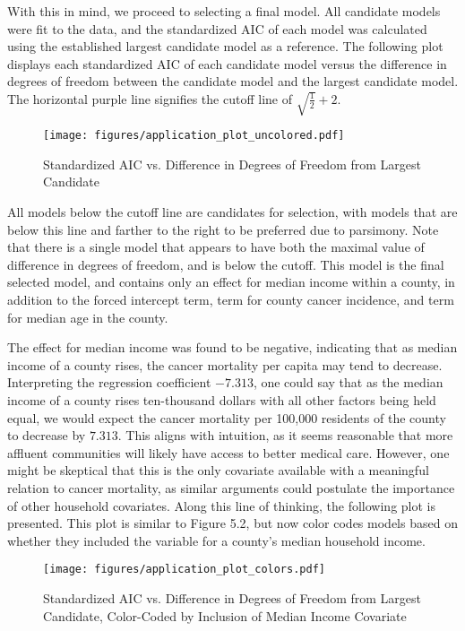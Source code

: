 		With this in mind, we proceed to selecting a final model. All candidate models were fit to the data, and the standardized AIC of each model was calculated
		using the established largest candidate model as a reference. The following plot displays each standardized AIC of each candidate model versus the difference in
		degrees of freedom between the candidate model and the largest candidate model. The horizontal purple line signifies the cutoff line of $\sqrt{\frac{1}{2}} + 2$.

		\begin{figure}[H]
			\centering
			\captionsetup{justification=centering}
			\texttt{[image: figures/application\_plot\_uncolored.pdf]}
			\caption{\label{fig:app_stand_AIC_plot_no_colors} Standardized AIC vs. Difference in Degrees of Freedom from Largest Candidate}
		\end{figure}

		All models below the cutoff line are candidates for selection, with models that are below this line and farther to the right to be preferred due to parsimony. Note
		that there is a single model that appears to have both the maximal value of difference in degrees of freedom, and is below the cutoff. This model is the
		final selected model, and contains only an effect for median income within a county, in addition to the forced intercept term, term for county cancer incidence,
		and term for median age in the county.
		
		The effect for median income was found to be negative, indicating that as median income of a county rises, the cancer mortality per capita may tend to
		decrease.  Interpreting the regression coefficient $-7.313$, one could say that as the median income of a county rises ten-thousand dollars with all other factors being
		held equal, we would expect the cancer mortality per 100,000 residents of the county to decrease by $7.313$. This aligns with intuition, as it seems reasonable
		that more affluent communities will likely have access to better medical care. However, one might be skeptical that this is the only covariate available with a meaningful
		relation to cancer mortality, as similar arguments could postulate the importance of other household covariates. Along this line of thinking, the following plot
		is presented. This plot is similar to Figure 5.2, but now color codes models based on whether they included the variable for a county's median household income.

		\begin{figure}[H]
			\centering
			\captionsetup{justification=centering}
			\texttt{[image: figures/application\_plot\_colors.pdf]}
			\caption{\label{fig:app_stand_AIC_plot_colors} Standardized AIC vs. Difference in Degrees of Freedom from Largest Candidate,
			Color-Coded by Inclusion of Median Income Covariate}
		\end{figure}

